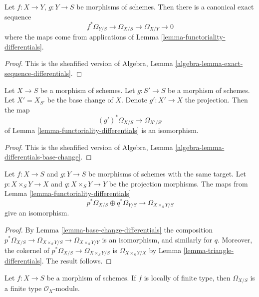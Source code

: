 \begin{lemma}
\label{lemma-triangle-differentials}
Let $f : X \to Y$, $g : Y \to S$ be morphisms of schemes.
Then there is a canonical exact sequence
$$
f^*\Omega_{Y/S} \to \Omega_{X/S} \to \Omega_{X/Y} \to 0
$$
where the maps come from applications of
Lemma \ref{lemma-functoriality-differentials}.
\end{lemma}

\begin{proof}
This is the sheafified version of
Algebra, Lemma \ref{algebra-lemma-exact-sequence-differentials}.
\end{proof}

\begin{lemma}
\label{lemma-base-change-differentials}
Let $X \to S$ be a morphism of schemes.
Let $g : S' \to S$ be a morphism of schemes.
Let $X' = X_{S'}$ be the base change of $X$.
Denote $g' : X' \to X$ the projection.
Then the map
$$
(g')^*\Omega_{X/S} \to \Omega_{X'/S'}
$$
of Lemma \ref{lemma-functoriality-differentials} is an isomorphism.
\end{lemma}

\begin{proof}
This is the sheafified version of
Algebra, Lemma \ref{algebra-lemma-differentials-base-change}.
\end{proof}

\begin{lemma}
\label{lemma-differential-product}
Let $f : X \to S$ and $g : Y \to S$ be morphisms of schemes with the same
target. Let $p : X \times_S Y \to X$ and $q : X \times_S Y \to Y$ be the
projection morphisms. The maps from
Lemma \ref{lemma-functoriality-differentials}
$$
p^*\Omega_{X/S} \oplus q^*\Omega_{Y/S}
\longrightarrow
\Omega_{X \times_S Y/S}
$$
give an isomorphism.
\end{lemma}

\begin{proof}
By Lemma \ref{lemma-base-change-differentials} the composition
$p^*\Omega_{X/S} \to \Omega_{X \times_S Y/S} \to \Omega_{X \times_S Y/Y}$
is an isomorphism, and similarly for $q$. Moreover, the cokernel
of $p^*\Omega_{X/S} \to \Omega_{X \times_S Y/S}$ is
$\Omega_{X \times_S Y/X}$ by
Lemma \ref{lemma-triangle-differentials}. The result follows.
\end{proof}

\begin{lemma}
\label{lemma-finite-type-differentials}
Let $f : X \to S$ be a morphism of schemes.
If $f$ is locally of finite type, then $\Omega_{X/S}$ is
a finite type $\mathcal{O}_X$-module.
\end{lemma}

